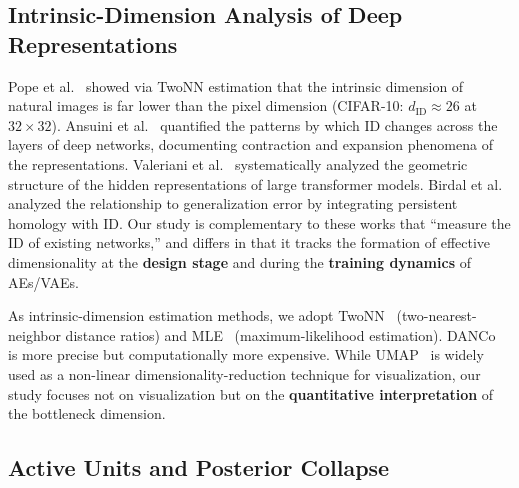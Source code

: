 \documentclass[make,article,submit,pdftex,moreauthors]{Definitions/mdpi}
\begin{document}
\subsection{Intrinsic-Dimension Analysis of Deep Representations}\label{sec:related_id}

Pope et al.~\cite{pope2021intrinsic} showed via TwoNN estimation that the
intrinsic dimension of natural images is far lower than the pixel dimension
(CIFAR-10: $d_\mathrm{ID} \approx 26$ at $32 \times 32$).
Ansuini et al.~\cite{ansuini2019intrinsic} quantified the patterns by which ID
changes across the layers of deep networks, documenting contraction and
expansion phenomena of the representations.
Valeriani et al.~\cite{valeriani2023geometry} systematically analyzed the
geometric structure of the hidden representations of large transformer models.
Birdal et al.~\cite{birdal2021intrinsic} analyzed the relationship to
generalization error by integrating persistent homology with ID.
Our study is complementary to these works that ``measure the ID of existing
networks,'' and differs in that it tracks the formation of effective
dimensionality at the \textbf{design stage} and during the
\textbf{training dynamics} of AEs/VAEs.

As intrinsic-dimension estimation methods, we adopt
TwoNN~\cite{facco2017twonn} (two-nearest-neighbor distance ratios) and
MLE~\cite{levina2005mle} (maximum-likelihood estimation).
DANCo~\cite{ceruti2014danco} is more precise but computationally more expensive.
While UMAP~\cite{mcinnes2018umap} is widely used as a non-linear
dimensionality-reduction technique for visualization, our study focuses not on
visualization but on the \textbf{quantitative interpretation} of the bottleneck
dimension.

\subsection{Active Units and Posterior Collapse}\label{sec:related_au}
\end{document}
